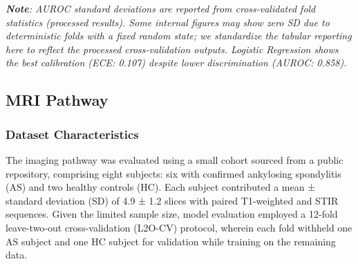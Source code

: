 \documentclass[12pt, a4paper]{article}
\begin{document}
\begin{table}[H]
\centering
\normalsize
\caption{Calibration Metrics Across Models}
\label{tab:calibration_metrics}
\end{table}

\textit{\textbf{Note}: AUROC standard deviations are reported from cross-validated fold statistics (processed results). Some internal figures may show zero SD due to deterministic folds with a fixed random state; we standardize the tabular reporting here to reflect the processed cross-validation outputs. Logistic Regression shows the best calibration (ECE: 0.107) despite lower discrimination (AUROC: 0.858).}

\subsection{MRI Pathway}

\subsubsection{Dataset Characteristics}
The imaging pathway was evaluated using a small cohort sourced from a public repository, comprising eight subjects: six with confirmed ankylosing spondylitis (AS) and two healthy controls (HC). Each subject contributed a mean ± standard deviation (SD) of 4.9 ± 1.2 slices with paired T1-weighted and STIR sequences. Given the limited sample size, model evaluation employed a 12-fold leave-two-out cross-validation (L2O-CV) protocol, wherein each fold withheld one AS subject and one HC subject for validation while training on the remaining data.
\end{document}

